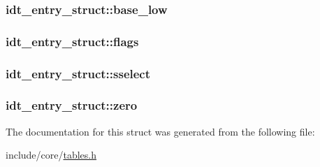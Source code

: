 \subsubsection[{base\+\_\+low}]{ idt\+\_\+entry\+\_\+struct\+::base\+\_\+low}\label{structidt__entry__struct_aefa75d6bfe07f1f544393b4dbccb3e76}
\hypertarget{structidt__entry__struct_a46c92bd8f07d5ff4e379a07b293c46af}{}
\subsubsection[{flags}]{ idt\+\_\+entry\+\_\+struct\+::flags}\label{structidt__entry__struct_a46c92bd8f07d5ff4e379a07b293c46af}
\hypertarget{structidt__entry__struct_a85254c7df6a612f4a4b3bb470ff3370c}{}
\subsubsection[{sselect}]{ idt\+\_\+entry\+\_\+struct\+::sselect}\label{structidt__entry__struct_a85254c7df6a612f4a4b3bb470ff3370c}
\hypertarget{structidt__entry__struct_a0d33c8509ae77d42e680d8d11b4c8035}{}
\subsubsection[{zero}]{ idt\+\_\+entry\+\_\+struct\+::zero}\label{structidt__entry__struct_a0d33c8509ae77d42e680d8d11b4c8035}


The documentation for this struct was generated from the following file\+:\begin{DoxyCompactItemize}
\item 
include/core/\hyperlink{tables_8h}{tables.\+h}\end{DoxyCompactItemize}
